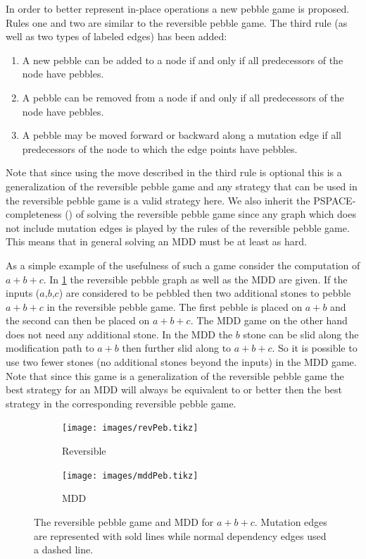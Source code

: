 In order to better represent in-place operations a new pebble game is proposed.
Rules one and two are similar to the reversible pebble game. The third rule
(as well as two types of labeled edges) has been added:

\begin{enumerate}

   \item A new pebble can be added to a node if and only if all predecessors of
     the node have pebbles.

   \item A pebble can be removed from a node if and only if all predecessors of
     the node have pebbles.

   \item A pebble may be moved forward or backward along a mutation edge if all
     predecessors of the node to which the edge points have pebbles.

\end{enumerate}

Note that since using the move described in the third rule is optional this is
a generalization of the reversible pebble game and any strategy that can be
used in the reversible pebble game is a valid strategy here. We also inherit
the PSPACE-completeness (\cite{chan13}) of solving the reversible pebble game
since any graph which does not include mutation edges is played by the rules of
the reversible pebble game. This means that in general solving an MDD must be
at least as hard.

As a simple example of the usefulness of such a game consider the computation
of $a+b+c$. In \cref{fig:mddExample} the reversible pebble graph as well as the
MDD are given. If the inputs ($a$,$b$,$c$) are considered to be pebbled then
two additional stones to pebble $a+b+c$ in the reversible pebble game. The
first pebble is placed on $a+b$ and the second can then be placed on $a+b+c$.
The MDD game on the other hand does not need any additional stone. In the MDD
the $b$ stone can be slid along the modification path to $a+b$ then further
slid along to $a+b+c$. So it is possible to use two fewer stones (no additional
stones beyond the inputs) in the MDD game. Note that since this game is a
generalization of the reversible pebble game the best strategy for an MDD will
always be equivalent to or better then the best strategy in the corresponding
reversible pebble game.

\begin{figure}
  \centering
  \begin{subfigure}{0.3\textwidth}
    \texttt{[image: images/revPeb.tikz]}
    \caption{Reversible}
  \end{subfigure}
  \qquad\qquad
  \begin{subfigure}{0.3\textwidth}
    \texttt{[image: images/mddPeb.tikz]}
    \caption{MDD}
  \end{subfigure}
  \label{fig:mddExample}
  \caption{The reversible pebble game and MDD for $a+b+c$. Mutation edges are
  represented with sold lines while normal dependency edges used a dashed line.}
\end{figure}


